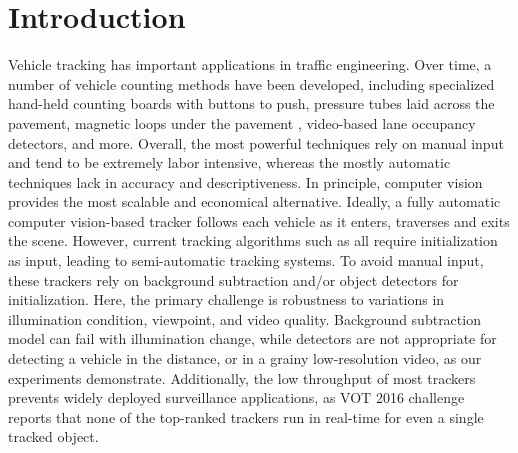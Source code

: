 \section{Introduction}
\label{sec:tracker-intro}

Vehicle tracking has important applications in traffic engineering.
Over time, a number of vehicle counting methods have been developed, including specialized hand-held counting boards with buttons to push, pressure tubes laid across the pavement, magnetic loops under the pavement 
\cite{klein2006traffic,mimbela2000summary},
video-based lane occupancy detectors, 
and more. Overall, the most powerful techniques rely on manual input and tend to be extremely labor intensive, whereas the mostly automatic techniques lack in accuracy and descriptiveness.
In principle, computer vision provides the most scalable and economical alternative. Ideally, a fully automatic computer vision-based tracker follows each vehicle as it enters, traverses and exits the scene.
However, current tracking algorithms such as \cite{henriques2015high,vojir2014robust,hare2011struck,possegger2015defense} all require initialization as input, leading to semi-automatic tracking systems. To avoid manual input, these trackers rely on background subtraction and/or object detectors for initialization. Here, the primary challenge is robustness to variations in illumination condition, viewpoint, and video quality. Background subtraction model can fail with illumination change, while detectors are not appropriate for detecting a vehicle in the distance, or in a grainy low-resolution video, as our experiments demonstrate. Additionally, the low throughput of most trackers prevents widely deployed surveillance applications, as VOT 2016 challenge reports that none of the top-ranked trackers run in real-time for even a single tracked object.



